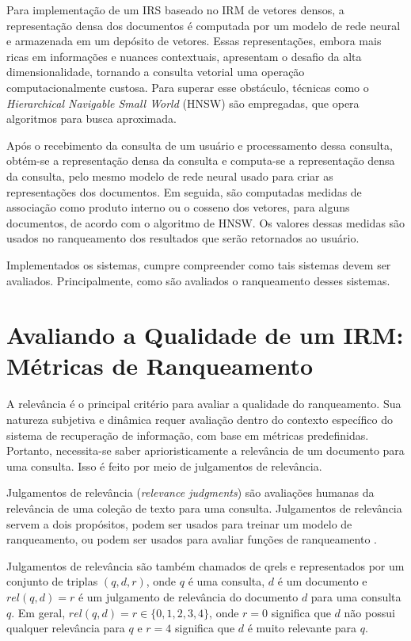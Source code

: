 \documentclass[
	12pt,				%
	openright,			%
	oneside,			%
	a4paper,			%
	english,			%
	french,				%
	spanish,			%
	brazil				%
	]{abntex2}
\begin{document}
Para implementação de um IRS baseado no IRM de vetores densos, a representação densa dos documentos é computada por um modelo de rede neural e armazenada em um depósito de vetores. Essas representações, embora mais ricas em informações e nuances contextuais, apresentam o desafio da alta dimensionalidade, tornando a consulta vetorial uma operação computacionalmente custosa.
Para superar esse obstáculo, técnicas como o \textit{Hierarchical Navigable Small World} (HNSW) são empregadas, que opera algoritmos para busca aproximada.

Após o recebimento da consulta de um usuário e processamento dessa consulta, obtém-se a representação densa da consulta e computa-se a representação densa da consulta, pelo mesmo modelo de rede neural usado para criar as representações dos documentos. Em seguida, são computadas medidas de associação como produto interno ou o cosseno dos vetores, para alguns documentos, de acordo com o algoritmo de HNSW. Os valores dessas medidas são usados no ranqueamento dos resultados que serão retornados ao usuário.

Implementados os sistemas, cumpre compreender como tais sistemas devem ser avaliados. Principalmente, como são avaliados o ranqueamento desses sistemas.

\section{Avaliando a Qualidade de um IRM: Métricas de Ranqueamento}\label{sec:metricas-de-ranqueamento}

A relevância é o principal critério para avaliar a qualidade do ranqueamento.
Sua natureza subjetiva e dinâmica requer avaliação dentro do contexto específico do sistema de recuperação de informação,
com base em métricas predefinidas.
Portanto, necessita-se saber aprioristicamente a relevância de um documento para uma consulta.
Isso é feito por meio de julgamentos de relevância.

Julgamentos de relevância (\textit{relevance judgments}) são avaliações humanas da relevância de uma coleção de texto para uma consulta.
Julgamentos de relevância servem a dois propósitos, podem ser usados para treinar um modelo de ranqueamento,
ou podem ser usados para avaliar funções de ranqueamento \cite{biblia}.

Julgamentos de relevância são também chamados de qrels e representados por um conjunto de triplas $(q, d, r)$, onde $q$ é uma consulta, $d$ é um documento e $rel(q, d) = r$
é um julgamento de relevância do documento $d$ para uma consulta $q$.
Em geral, $rel(q, d) = r \in \{0, 1, 2, 3, 4\}$, onde $r = 0$ significa que $d$ não possui qualquer relevância para $q$ e $r = 4$ significa que
$d$ é muito relevante para $q$.
\end{document}
